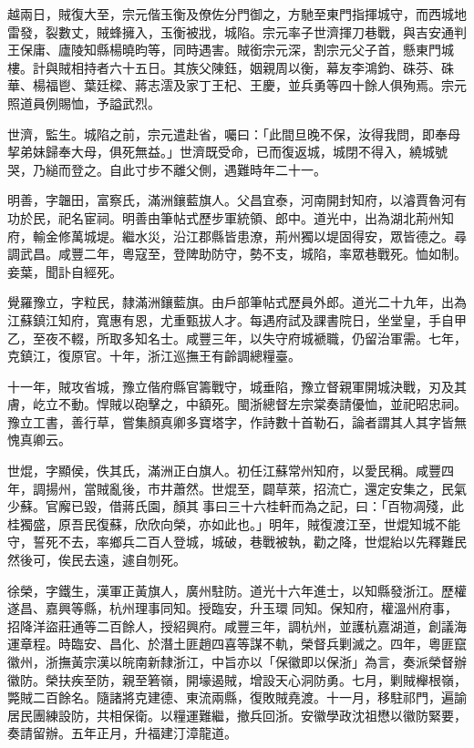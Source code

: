 \begin{pinyinscope}
越兩日，賊復大至，宗元偕玉衡及僚佐分門御之，方馳至東門指揮城守，而西城地雷發，裂數丈，賊蜂擁入，玉衡被戕，城陷。宗元率子世濟揮刀巷戰，與吉安通判王保庸、廬陵知縣楊曉昀等，同時遇害。賊銜宗元深，割宗元父子首，懸東門城樓。計與賊相持者六十五日。其族父陳鈺，姻親周以衡，幕友李鴻鈞、硃芬、硃華、楊福鬯、葉廷樑、蔣志澐及家丁王杞、王慶，並兵勇等四十餘人俱殉焉。宗元照道員例賜恤，予謚武烈。

世濟，監生。城陷之前，宗元遣赴省，囑曰：「此間旦晚不保，汝得我問，即奉母挈弟妹歸奉大母，俱死無益。」世濟既受命，已而復返城，城閉不得入，繞城號哭，乃縋而登之。自此寸步不離父側，遇難時年二十一。

明善，字韞田，富察氏，滿洲鑲藍旗人。父昌宜泰，河南開封知府，以濬賈魯河有功於民，祀名宦祠。明善由筆帖式歷步軍統領、郎中。道光中，出為湖北荊州知府，輸金修萬城堤。繼水災，沿江郡縣皆患潦，荊州獨以堤固得安，眾皆德之。尋調武昌。咸豐二年，粵寇至，登陴助防守，勢不支，城陷，率眾巷戰死。恤如制。妾葉，聞訃自經死。

覺羅豫立，字粒民，隸滿洲鑲藍旗。由戶部筆帖式歷員外郎。道光二十九年，出為江蘇鎮江知府，寬惠有恩，尤重甄拔人才。每遇府試及課書院日，坐堂皇，手自甲乙，至夜不輟，所取多知名士。咸豐三年，以失守府城褫職，仍留治軍需。七年，克鎮江，復原官。十年，浙江巡撫王有齡調總糧臺。

十一年，賊攻省城，豫立偕府縣官籌戰守，城垂陷，豫立督親軍開城決戰，刃及其膚，屹立不動。悍賊以砲擊之，中額死。閩浙總督左宗棠奏請優恤，並祀昭忠祠。豫立工書，善行草，嘗集顏真卿多寶塔字，作詩數十首勒石，論者謂其人其字皆無愧真卿云。

世焜，字顯侯，佚其氏，滿洲正白旗人。初任江蘇常州知府，以愛民稱。咸豐四年，調揚州，當賊亂後，市井蕭然。世焜至，闢草萊，招流亡，還定安集之，民氣少蘇。官廨已毀，借蔣氏園，顏其事曰三十六桂軒而為之記，曰：「百物凋殘，此桂獨盛，原吾民復蘇，欣欣向榮，亦如此也。」明年，賊復渡江至，世焜知城不能守，誓死不去，率鄉兵二百人登城，城破，巷戰被執，勸之降，世焜紿以先釋難民然後可，俟民去遠，遽自刎死。

徐榮，字鐵生，漢軍正黃旗人，廣州駐防。道光十六年進士，以知縣發浙江。歷權遂昌、嘉興等縣，杭州理事同知。授臨安，升玉環同知。保知府，權溫州府事，招降洋盜莊通等二百餘人，授紹興府。咸豐三年，調杭州，並護杭嘉湖道，創議海運章程。時臨安、昌化、於潛土匪趙四喜等謀不軌，榮督兵剿滅之。四年，粵匪竄徽州，浙撫黃宗漢以皖南新隸浙江，中旨亦以「保徽即以保浙」為言，奏派榮督辦徽防。榮扶疾至防，親至箬嶺，開壕遏賊，增設天心洞防勇。七月，剿賊櫸根嶺，斃賊二百餘名。隨諸將克建德、東流兩縣，復敗賊堯渡。十一月，移駐祁門，遍諭居民團練設防，共相保衛。以糧運難繼，撤兵回浙。安徽學政沈祖懋以徽防緊要，奏請留辦。五年正月，升福建汀漳龍道。


\end{pinyinscope}

